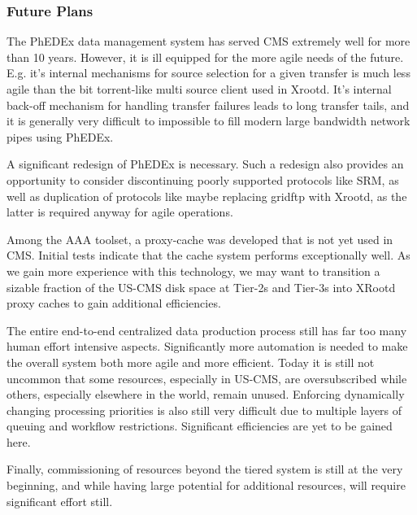 \documentclass[11pt,a4paper]{article}
\begin{document}

\subsubsection{Future Plans}

The PhEDEx data management system has served CMS extremely well for more than 10 years.
However, it is ill equipped for the more agile needs of the future. E.g. it's internal mechanisms for
source selection for a given transfer is much less agile than the bit torrent-like multi source client
used in Xrootd. It's internal back-off mechanism for handling transfer failures leads to long transfer
tails, and it is generally very difficult to impossible to fill modern large bandwidth network pipes using PhEDEx.

A significant redesign of PhEDEx is necessary. 
Such a redesign also provides an opportunity to consider discontinuing poorly supported protocols like SRM, 
as well as duplication of protocols like maybe replacing gridftp with Xrootd, as the latter is required anyway
for agile operations.

Among the AAA toolset, a proxy-cache was developed that is not yet used in CMS. 
Initial tests indicate that the cache system performs exceptionally well. As we gain more experience with this technology, 
we may want to transition a sizable  fraction of the US-CMS disk space at Tier-2s and Tier-3s into XRootd proxy caches
to gain additional efficiencies.

The entire end-to-end centralized data production process still has far too many human effort intensive aspects.
Significantly more automation is needed to make the overall system both more agile and more efficient. Today it is still not uncommon
that some resources, especially in US-CMS, are oversubscribed while others, especially elsewhere in the world, remain unused. 
Enforcing dynamically changing processing priorities is also still very difficult due to multiple layers of queuing and workflow
restrictions. Significant efficiencies are yet to be gained here.

Finally, commissioning of resources beyond the tiered system is still at the very beginning, and while having large potential
for additional resources, will require significant effort still.
\end{document}

